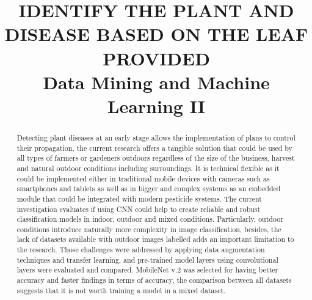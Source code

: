 \documentclass[conference]{IEEEtran}
\begin{document}
\title{IDENTIFY THE PLANT AND DISEASE BASED ON THE LEAF PROVIDED\\
{\footnotesize Data Mining and Machine Learning II}
}

\author{
\and
{}
\and
{}
\and
{}
}

\maketitle

\begin{abstract}
Detecting plant diseases at an early stage allows the implementation of plans to control their propagation, the current research offers a tangible solution that could be used by all types of farmers or gardeners outdoors regardless of the size of the business, harvest and natural outdoor conditions including surroundings. It is technical flexible as it could be implemented either in traditional mobile devices with cameras such as smartphones and tablets as well as in bigger and complex systems as an embedded module that could be integrated with modern pesticide systems. The current investigation evaluates if using CNN could help to create reliable and robust classification models in indoor, outdoor and mixed conditions. Particularly, outdoor conditions introduce naturally more complexity in image classification, besides, the lack of datasets available with outdoor images labelled adds an important limitation to the research. Those challenges were addressed by applying data augmentation techniques and transfer learning, and pre-trained model layers using convolutional layers were evaluated and compared. MobileNet v.2 was selected for having better accuracy and faster findings in terms of accuracy, the comparison between all datasets suggests that it is not worth training a model in a mixed dataset.
\end{abstract}
\end{document}
